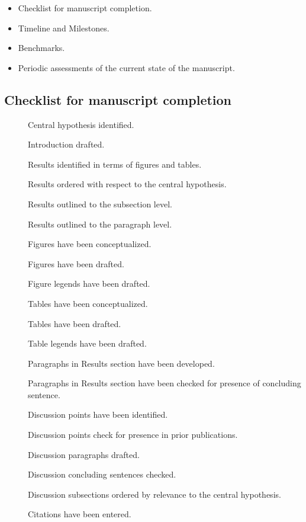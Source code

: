 \documentclass[10pt,letterpaper]{article}
\begin{document}
\begin{itemize}
  \item Checklist for manuscript completion.
  \item Timeline and Milestones.
  \item Benchmarks.
  \item Periodic assessments of the current state of the manuscript.
\end{itemize}

\subsection{Checklist for manuscript completion}

\begin{description}
  \item [\checkmark] Central hypothesis identified.
  \item [] Introduction drafted.
  \item [] Results identified in terms of figures and tables.
  \item [] Results ordered with respect to the central hypothesis.
  \item [] Results outlined to the subsection level.
  \item [] Results outlined to the paragraph level.
  \item [] Figures have been conceptualized.
  \item [] Figures have been drafted.
  \item [] Figure legends have been drafted.
  \item [] Tables have been conceptualized.
  \item [] Tables have been drafted.
  \item [] Table legends have been drafted.
  \item [] Paragraphs in Results section have been developed.
  \item [] Paragraphs in Results section have been checked for presence of concluding sentence.
  \item [] Discussion points have been identified.
  \item [] Discussion points check for presence in prior publications.
  \item [] Discussion paragraphs drafted.
  \item [] Discussion concluding sentences checked.
  \item [] Discussion subsections ordered by relevance to the central hypothesis.
  \item [] Citations have been entered.

\end{description}
\end{document}
